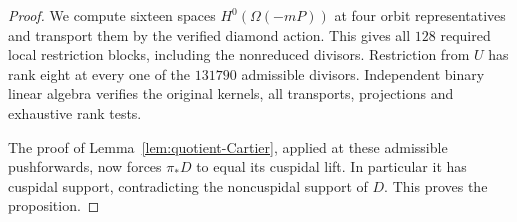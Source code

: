 \begin{proof}
We compute sixteen spaces $H^0(\Omega(-mP))$ at four orbit
representatives and transport them by the verified diamond action.
This gives all $128$ required local restriction blocks, including
the nonreduced divisors. Restriction from $U$ has rank eight at
every one of the $131790$ admissible divisors. Independent binary
linear algebra verifies the original kernels, all transports,
projections and exhaustive rank tests.

The proof of Lemma~\ref{lem:quotient-Cartier}, applied at these
admissible pushforwards, now forces $\pi_*D$ to equal its cuspidal
lift. In particular it has cuspidal support, contradicting the
noncuspidal support of $D$. This proves the proposition.
\end{proof}
